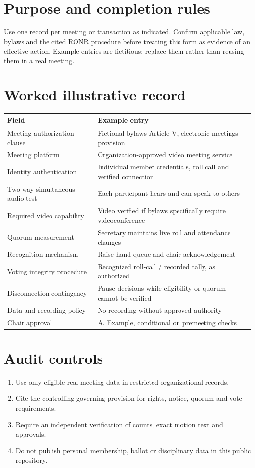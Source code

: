 \documentclass[11pt]{article}
\begin{document}
\SuiteOpen
\section{Purpose and completion rules}
Use one record per meeting or transaction as indicated. Confirm applicable law, bylaws and the cited RONR procedure before treating this form as evidence of an effective action. Example entries are fictitious; replace them rather than reusing them in a real meeting.

\section{Worked illustrative record}
\begin{longtable}{@{}p{.38\linewidth}p{.55\linewidth}@{}}\toprule Field & Example entry\\\midrule\endhead


Meeting authorization clause & Fictional bylaws Article V, electronic meetings provision\\
Meeting platform & Organization-approved video meeting service\\
Identity authentication & Individual member credentials, roll call and verified connection\\
Two-way simultaneous audio test & Each participant hears and can speak to others\\
Required video capability & Video verified if bylaws specifically require videoconference\\
Quorum measurement & Secretary maintains live roll and attendance changes\\
Recognition mechanism & Raise-hand queue and chair acknowledgement\\
Voting integrity procedure & Recognized roll-call / recorded tally, as authorized\\
Disconnection contingency & Pause decisions while eligibility or quorum cannot be verified\\
Data and recording policy & No recording without approved authority\\
Chair approval & A. Example, conditional on premeeting checks\\
\bottomrule\end{longtable}
\section{Audit controls}
\begin{enumerate}[leftmargin=*,itemsep=4pt]
\item Use only eligible real meeting data in restricted organizational records.
\item Cite the controlling governing provision for rights, notice, quorum and vote requirements.
\item Require an independent verification of counts, exact motion text and approvals.
\item Do not publish personal membership, ballot or disciplinary data in this public repository.
\end{enumerate}
\end{document}

